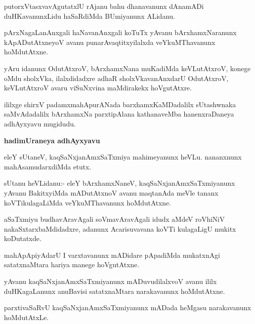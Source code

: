 \begin{mng}
putorxVtasxvavAgutatxlU rAjanu bahu dhanavanunx dAnamADi duHKavanunxLidu haSaRdiMda BUmiyanunx ALidanu.
\end{mng}

\begin{mng}
pArxNagaLanAnxgali haNavanAnxgali koTuTx yAvanu bArxhamxNaranunx kApADutAtxneyoV avanu punarAvaqtitxyilalxda veYkuMThavanunx hoMdutAtxne.
\end{mng}

\begin{mng}
yAru idanunx OdutAtxroV, bArxhamxNana muKadiMda keVLutAtxroV, konege oMdu sholxVka, ilalxdidadxre adhaR sholxVkavanAnxdarU OdutAtxroV, keVLutAtxroV avaru viSuNxvina maMdirakekx hoVgutAtxre.
\end{mng}
ililxge shirxV padamxmahApurANada barxhamxKaMDadalilx sUtashwnaka saMvAdadalilx bArxhamxNa parxtipAlana kathanaveMba hanenxraDaneya adhAyxyavu mugidudu.

\begin{center}
\textbf{\large hadimUraneya adhAyxyavu}
\end{center}

\begin{mng}
eleY sUtaneV, kaqSaNxjanAmxSaTxmiya mahimeyanunx heVLu. nananxnunx mahAsamudarxdiMda etutx.
\end{mng}

\begin{mng}
sUtanu heVLidanu:- eleY bArxhamxNaneV, kaqSaNxjanAmxSaTxmiyanunx yAvanu BakitxyiMda mADutAtxnoV avanu maqtanAda meVle tananx koVTikulagaLiMda veYkuMThavanunx hoMdutAtxne.
\end{mng}

\begin{mng}
aSaTxmiyu budhavAravAgali soVmavAravAgali idudx aMdeV roVhiNiV nakaSxtarxbaMdidadxre, adanunx Acarisuvavana koVTi kulagaLigU mukitx koDutatxde.
\end{mng}

\begin{mng}
mahApApiyAdarU I varxtavanunx mADidare pApadiMda mukatxnAgi satatxnaMtara hariya manege hoVgutAtxne.
\end{mng}

\begin{mng}
yAvanu kaqSaNxjanAmxSaTxmiyanunx mADuvudilalxvoV avanu ililx duHKagaLanunx anuBavisi satatxnaMtara narakavanunx hoMdutAtxne.
\end{mng}

\begin{mng}
parxtivaSaRvU kaqSaNxjanAmxSaTxmiyanunx mADada heMgasu narakavanunx hoMdutAtxLe.
\end{mng}

